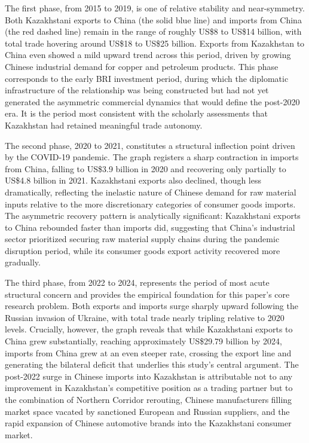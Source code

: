 \documentclass[12pt]{article}
\begin{document}
The first phase, from 2015 to 2019, is one of relative stability and near-symmetry. Both Kazakhstani exports to China (the solid blue line) and imports from China (the red dashed line) remain in the range of roughly US\$8 to US\$14 billion, with total trade hovering around US\$18 to US\$25 billion. Exports from Kazakhstan to China even showed a mild upward trend across this period, driven by growing Chinese industrial demand for copper and petroleum products. This phase corresponds to the early BRI investment period, during which the diplomatic infrastructure of the relationship was being constructed but had not yet generated the asymmetric commercial dynamics that would define the post-2020 era. It is the period most consistent with the scholarly assessments that Kazakhstan had retained meaningful trade autonomy.\par

The second phase, 2020 to 2021, constitutes a structural inflection point driven by the COVID-19 pandemic. The graph registers a sharp contraction in imports from China, falling to US\$3.9 billion in 2020 and recovering only partially to US\$4.8 billion in 2021. Kazakhstani exports also declined, though less dramatically, reflecting the inelastic nature of Chinese demand for raw material inputs relative to the more discretionary categories of consumer goods imports. The asymmetric recovery pattern is analytically significant: Kazakhstani exports to China rebounded faster than imports did, suggesting that China's industrial sector prioritized securing raw material supply chains during the pandemic disruption period, while its consumer goods export activity recovered more gradually.\par

The third phase, from 2022 to 2024, represents the period of most acute structural concern and provides the empirical foundation for this paper's core research problem. Both exports and imports surge sharply upward following the Russian invasion of Ukraine, with total trade nearly tripling relative to 2020 levels. Crucially, however, the graph reveals that while Kazakhstani exports to China grew substantially, reaching approximately US\$29.79 billion by 2024, imports from China grew at an even steeper rate, crossing the export line and generating the bilateral deficit that underlies this study's central argument. The post-2022 surge in Chinese imports into Kazakhstan is attributable not to any improvement in Kazakhstan's competitive position as a trading partner but to the combination of Northern Corridor rerouting, Chinese manufacturers filling market space vacated by sanctioned European and Russian suppliers, and the rapid expansion of Chinese automotive brands into the Kazakhstani consumer market.\par
\end{document}
